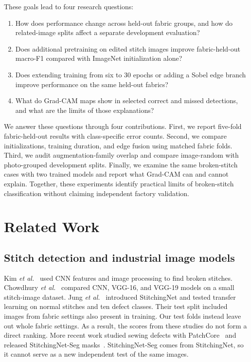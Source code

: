 \documentclass[conference,a4paper]{IEEEtran}
\begin{document}
These goals lead to four research questions:
\begin{enumerate}
\item[\textbf{RQ1:}] How does performance change across held-out fabric groups, and how do related-image splits affect a separate development evaluation?
\item[\textbf{RQ2:}] Does additional pretraining on edited stitch images improve fabric-held-out macro-F1 compared with ImageNet initialization alone?
\item[\textbf{RQ3:}] Does extending training from six to 30 epochs or adding a Sobel edge branch improve performance on the same held-out fabrics?
\item[\textbf{RQ4:}] What do Grad-CAM maps show in selected correct and missed detections, and what are the limits of those explanations?
\end{enumerate}
We answer these questions through four contributions. First, we report five-fold fabric-held-out results with class-specific error counts. Second, we compare initializations, training duration, and edge fusion using matched fabric folds. Third, we audit augmentation-family overlap and compare image-random with photo-grouped development splits. Finally, we examine the same broken-stitch cases with two trained models and report what Grad-CAM can and cannot explain. Together, these experiments identify practical limits of broken-stitch classification without claiming independent factory validation.

\section{Related Work}
\subsection{Stitch detection and industrial image models}
Kim \emph{et al.}~\cite{kim2022} used CNN features and image processing to find broken stitches. Chowdhury \emph{et al.}~\cite{chowdhury2024} compared CNN, VGG-16, and VGG-19 models on a small stitch-image dataset. Jung \emph{et al.}~\cite{jung2025} introduced StitchingNet and tested transfer learning on normal stitches and ten defect classes. Their test split included images from fabric settings also present in training. Our test folds instead leave out whole fabric settings. As a result, the scores from these studies do not form a direct ranking. More recent work studied sewing defects with PatchCore~\cite{kimpatch2026} and released StitchingNet-Seg masks~\cite{parkseg2026}. StitchingNet-Seg comes from StitchingNet, so it cannot serve as a new independent test of the same images.
\end{document}
